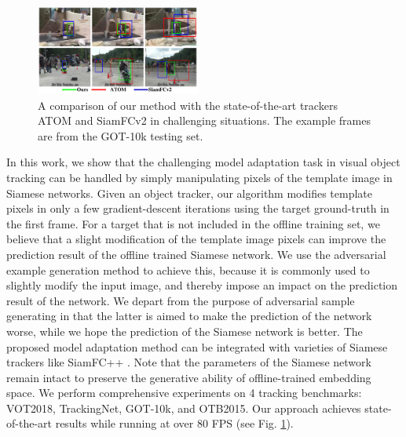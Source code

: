 \documentclass[journal]{IEEEtran}
\begin{document}
\begin{figure}[t]
    \centering
    \includegraphics[width=0.48\textwidth]{images/got10k/visulization2.pdf}
    \vspace{-0.3cm}
    \caption{A comparison of our method with the state-of-the-art trackers ATOM \cite{danelljan2019atom} and SiamFCv2 \cite{bertinetto2016fully} in challenging situations. The example frames are from the GOT-10k \cite{huang2018got} testing set.}
    \vspace{-0.3cm}
    \label{fig:vis}
\end{figure}

In this work, we show that the challenging model adaptation task in visual object tracking can be handled by simply manipulating pixels of the template image in Siamese networks. Given an object tracker, our algorithm modifies template pixels in only a few gradient-descent iterations using the target ground-truth in the first frame. For a target that is not included in the offline training set, we believe that a slight modification of the template image pixels can improve the prediction result of the offline trained Siamese network. We use the adversarial example generation method to achieve this, because it is commonly used to slightly modify the input image, and thereby impose an impact on the prediction result of the network. We depart from the purpose of adversarial sample generating in that the latter is aimed to make the prediction of the network worse, while we hope the prediction of the Siamese network is better. The proposed model adaptation method can be integrated with varieties of Siamese trackers like SiamFC++ \cite{SiamFC++}. Note that the parameters of the Siamese network remain intact to preserve the generative ability of offline-trained embedding space. We perform comprehensive experiments on 4 tracking benchmarks: VOT2018\cite{kristan2018sixth}, TrackingNet\cite{muller2018trackingnet}, GOT-10k\cite{huang2018got}, and OTB2015\cite{wu2013online}. Our approach achieves state-of-the-art results while running at over 80 FPS (see Fig. \ref{fig:vis}).
\end{document}
